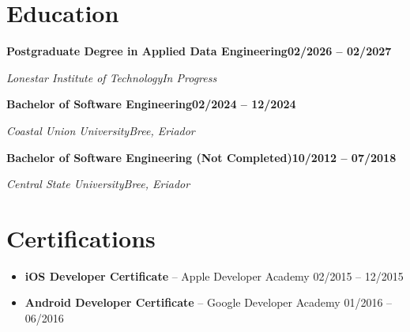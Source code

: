 \documentclass[letterpaper,11pt]{article}
\newlength{\cventrysep}\setlength{\cventrysep}{6pt}  %
\newlength{\cvblocksep}\setlength{\cvblocksep}{4pt}  %
\newcommand{\cvsection}[1]{\section{#1}}
\newcommand{\cventry}[4]{%
  \noindent\normalsize\textbf{#1}\hfill\small\textbf{#4}\par
  \nopagebreak[4]
  \noindent\normalsize\textit{\textcolor{accent}{#2}}\hfill\small\textit{#3}\par
  \nopagebreak[4]
}
\begin{document}
\vspace{\cventrysep}

\cvsection{Education}

\cventry{Postgraduate Degree in Applied Data Engineering}{Lonestar Institute of Technology}{In Progress}{02/2026 -- 02/2027}

\vspace{\cvblocksep}

\cventry{Bachelor of Software Engineering}{Coastal Union University}{Bree, Eriador}{02/2024 -- 12/2024}

\vspace{\cvblocksep}

\cventry{Bachelor of Software Engineering (Not Completed)}{Central State University}{Bree, Eriador}{10/2012 -- 07/2018}

\vspace{\cventrysep}

\cvsection{Certifications}
\begin{itemize}\small
    \item \textbf{iOS Developer Certificate} -- Apple Developer Academy \hfill 02/2015 -- 12/2015
    \item \textbf{Android Developer Certificate} -- Google Developer Academy \hfill 01/2016 -- 06/2016
\end{itemize}
\end{document}
